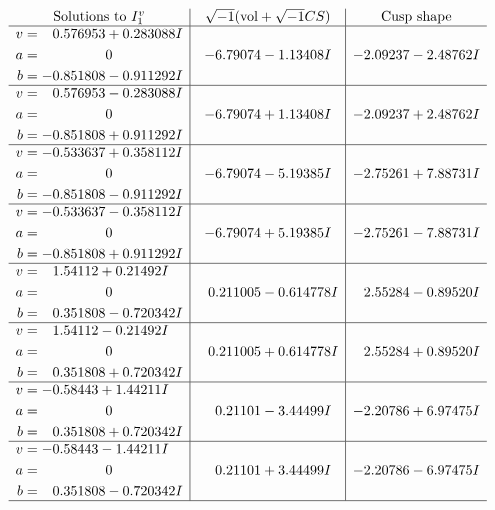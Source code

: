 \documentclass[1p]{elsarticle_modified}
\theoremstyle{definition}
\newcommand{\I}{\sqrt{-1}}
\begin{document}
$$\begin{array}{c|c|c}  
\text{Solutions to }I^v_{1}& \I (\text{vol} + \sqrt{-1}CS) & \text{Cusp shape}\\
 \hline 
\begin{aligned}
v &= \phantom{-}0.576953 + 0.283088 I \\
a &= \phantom{-0.000000 } 0 \\
b &= -0.851808 - 0.911292 I\end{aligned}
 & -6.79074 - 1.13408 I & -2.09237 - 2.48762 I \\ \hline\begin{aligned}
v &= \phantom{-}0.576953 - 0.283088 I \\
a &= \phantom{-0.000000 } 0 \\
b &= -0.851808 + 0.911292 I\end{aligned}
 & -6.79074 + 1.13408 I & -2.09237 + 2.48762 I \\ \hline\begin{aligned}
v &= -0.533637 + 0.358112 I \\
a &= \phantom{-0.000000 } 0 \\
b &= -0.851808 - 0.911292 I\end{aligned}
 & -6.79074 - 5.19385 I & -2.75261 + 7.88731 I \\ \hline\begin{aligned}
v &= -0.533637 - 0.358112 I \\
a &= \phantom{-0.000000 } 0 \\
b &= -0.851808 + 0.911292 I\end{aligned}
 & -6.79074 + 5.19385 I & -2.75261 - 7.88731 I \\ \hline\begin{aligned}
v &= \phantom{-}1.54112 + 0.21492 I \\
a &= \phantom{-0.000000 } 0 \\
b &= \phantom{-}0.351808 - 0.720342 I\end{aligned}
 & \phantom{-}0.211005 - 0.614778 I & \phantom{-}2.55284 - 0.89520 I \\ \hline\begin{aligned}
v &= \phantom{-}1.54112 - 0.21492 I \\
a &= \phantom{-0.000000 } 0 \\
b &= \phantom{-}0.351808 + 0.720342 I\end{aligned}
 & \phantom{-}0.211005 + 0.614778 I & \phantom{-}2.55284 + 0.89520 I \\ \hline\begin{aligned}
v &= -0.58443 + 1.44211 I \\
a &= \phantom{-0.000000 } 0 \\
b &= \phantom{-}0.351808 + 0.720342 I\end{aligned}
 & \phantom{-}0.21101 - 3.44499 I & -2.20786 + 6.97475 I \\ \hline\begin{aligned}
v &= -0.58443 - 1.44211 I \\
a &= \phantom{-0.000000 } 0 \\
b &= \phantom{-}0.351808 - 0.720342 I\end{aligned}
 & \phantom{-}0.21101 + 3.44499 I & -2.20786 - 6.97475 I\\
 \hline 
 \end{array}$$\newpage
\end{document}

